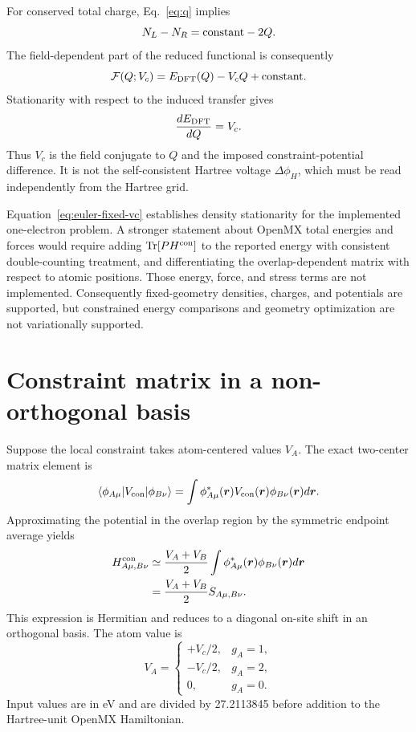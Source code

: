 \documentclass[11pt,a4paper]{article}
\begin{document}
For conserved total charge, Eq.~\eqref{eq:q} implies
\begin{equation}
 N_L-N_R={\rm constant}-2Q.
\end{equation}
The field-dependent part of the reduced functional is consequently
\begin{equation}
 \mathcal F(Q;V_c)=E_{\rm DFT}(Q)-V_cQ+{\rm constant}.
\end{equation}
Stationarity with respect to the induced transfer gives
\begin{equation}
 \frac{dE_{\rm DFT}}{dQ}=V_c.
 \label{eq:conjugate-vc}
\end{equation}
Thus $V_c$ is the field conjugate to $Q$ and the imposed constraint-potential
difference. It is not the self-consistent Hartree voltage
$\Delta\phi_H$, which must be read independently from the Hartree grid.

Equation~\eqref{eq:euler-fixed-vc} establishes density stationarity for the
implemented one-electron problem. A stronger statement about OpenMX total
energies and forces would require adding $\mathrm{Tr}[P H^{\rm con}]$ to the
reported energy with consistent double-counting treatment, and differentiating
the overlap-dependent matrix with respect to atomic positions. Those energy,
force, and stress terms are not implemented. Consequently fixed-geometry
densities, charges, and potentials are supported, but constrained energy
comparisons and geometry optimization are not variationally supported.

\section{Constraint matrix in a non-orthogonal basis}

Suppose the local constraint takes atom-centered values $V_A$. The exact
two-center matrix element is
\begin{equation}
 \langle\phi_{A\mu}|V_{\rm con}|\phi_{B\nu}\rangle
 =\int\phi_{A\mu}^*(\bm r)V_{\rm con}(\bm r)
 \phi_{B\nu}(\bm r)d\bm r.
\end{equation}
Approximating the potential in the overlap region by the symmetric endpoint
average yields
\begin{align}
 H^{\rm con}_{A\mu,B\nu}
 &\simeq\frac{V_A+V_B}{2}
 \int\phi_{A\mu}^*(\bm r)\phi_{B\nu}(\bm r)d\bm r\\
 &=\frac{V_A+V_B}{2}S_{A\mu,B\nu}.
 \label{eq:hcon}
\end{align}
This expression is Hermitian and reduces to a diagonal on-site shift in an
orthogonal basis. The atom value is
\begin{equation}
 V_A=\begin{cases}+V_c/2,&g_A=1,\\-V_c/2,&g_A=2,\\0,&g_A=0.
 \end{cases}
\end{equation}
Input values are in eV and are divided by 27.2113845 before addition to the
Hartree-unit OpenMX Hamiltonian.
\end{document}
